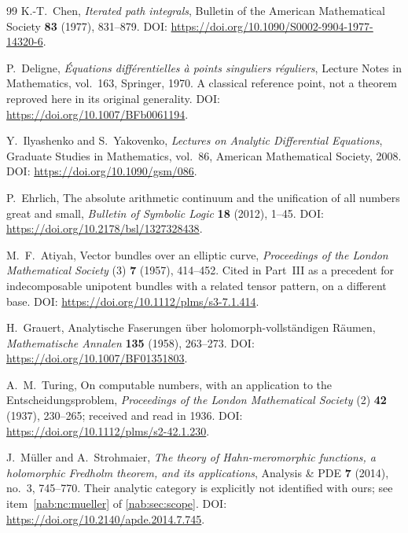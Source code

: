 \documentclass[11pt,letterpaper]{article}
\theoremstyle{definition}
\theoremstyle{remark}
\numberwithin{equation}{section}
\begin{document}
\begin{thebibliography}{99}
K.-T.~Chen, \emph{Iterated path integrals},
Bulletin of the American Mathematical Society \textbf{83} (1977), 831--879.
DOI: \url{https://doi.org/10.1090/S0002-9904-1977-14320-6}.

P.~Deligne, \emph{\'Equations diff\'erentielles \`a points singuliers
r\'eguliers}, Lecture Notes in Mathematics, vol.~163, Springer, 1970. A
classical reference point, not a theorem reproved here in its original
generality.
DOI: \url{https://doi.org/10.1007/BFb0061194}.

Y.~Ilyashenko and S.~Yakovenko, \emph{Lectures on Analytic Differential
Equations}, Graduate Studies in Mathematics, vol.~86, American Mathematical
Society, 2008.
DOI: \url{https://doi.org/10.1090/gsm/086}.

P.~Ehrlich, The absolute arithmetic continuum and the unification of all
numbers great and small, \emph{Bulletin of Symbolic Logic} \textbf{18} (2012),
1--45.
DOI: \url{https://doi.org/10.2178/bsl/1327328438}.

M.~F.~Atiyah, Vector bundles over an elliptic curve, \emph{Proceedings of the
London Mathematical Society} (3) \textbf{7} (1957), 414--452. Cited in
Part~III as a precedent for indecomposable unipotent bundles with a related
tensor pattern, on a different base.
DOI: \url{https://doi.org/10.1112/plms/s3-7.1.414}.

H.~Grauert, Analytische Faserungen \"uber holomorph-vollst\"andigen R\"aumen,
\emph{Mathematische Annalen} \textbf{135} (1958), 263--273.
DOI: \url{https://doi.org/10.1007/BF01351803}.

A.~M.~Turing, On computable numbers, with an application to the
Entscheidungsproblem, \emph{Proceedings of the London Mathematical Society} (2)
\textbf{42} (1937), 230--265; received and read in 1936.
DOI: \url{https://doi.org/10.1112/plms/s2-42.1.230}.

J.~M\"uller and A.~Strohmaier, \emph{The theory of Hahn-meromorphic functions,
a holomorphic Fredholm theorem, and its applications},
Analysis \& PDE \textbf{7} (2014), no.~3, 745--770. Their analytic category is
explicitly not identified with ours; see item~\ref{nab:nc:mueller} of
\cref{nab:sec:scope}.
DOI: \url{https://doi.org/10.2140/apde.2014.7.745}.

\end{thebibliography}
\end{document}
